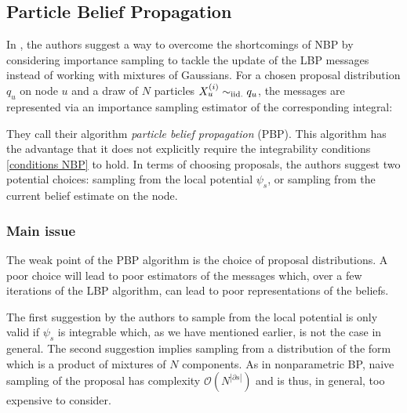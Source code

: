 \subsection{\label{point:PBP}Particle Belief Propagation}

In \citet{ihler09}, the authors suggest a way to overcome the shortcomings of NBP by considering importance sampling to tackle the update of the LBP messages instead of working with mixtures of Gaussians. For a chosen proposal distribution $q_{u}$ on node $u$ and a draw of $N$ particles $X_{u}^{(i)}\sim_{\mathrm{iid.}} q_{u}$, the messages are represented via an importance sampling estimator of the corresponding integral:

They call their algorithm \emph{particle belief propagation} (PBP).
This algorithm has the advantage that it does not explicitly require the integrability conditions \eqref{conditions NBP} to hold. 
In terms of choosing proposals, the authors suggest two potential choices: sampling from the local potential $\psi_{s}$, or sampling from the current belief estimate on the node. 

\subsubsection{Main issue}

The weak point of the PBP algorithm is the choice of proposal distributions.  A poor choice will lead to poor estimators of the messages which, over a few iterations of the LBP algorithm, can lead to poor representations of the beliefs.

The first suggestion by the authors to sample from the local potential is only valid if $\psi_{s}$ is integrable which, as we have mentioned earlier, is not the case in general. The second suggestion implies sampling from a distribution of the form
%
%
which is a product of mixtures of $N$ components. As in nonparametric BP, naive sampling of the proposal has complexity $\mathcal O {(N^{|\partial {s}|})}$ and is thus, in general, too expensive to consider.

